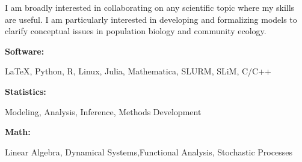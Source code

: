 \documentclass[9pt]{developercv} %
\begin{document}
\begin{minipage}[t]{0.46\textwidth}
	\vspace{-6pt}

	I am broadly interested in collaborating on any scientific topic where my skills are useful. I am particularly interested in developing and formalizing models to clarify conceptual issues in population biology and community ecology. \\

\end{minipage}
\hfill %
\begin{minipage}[t]{0.465\textwidth}
    \vspace{-6pt}
    
    \begin{minipage}[t]{0.2\textwidth}
        \textbf{Software:}
    \end{minipage}
    \hfill
    \begin{minipage}[t]{0.75\textwidth}
      \LaTeX, Python, R, Linux, Julia, Mathematica, SLURM, SLiM, C/C++
    \end{minipage}
    \vspace{4mm}

    \vspace{-5 pt}
    \begin{minipage}[t]{0.2\textwidth}
        \textbf{Statistics:}
    \end{minipage}
    \hfill
    \begin{minipage}[t]{0.75\textwidth}
      Modeling, Analysis, Inference, Methods Development
    \end{minipage}
    \vspace{4mm}

    \vspace{-5 pt}
    \begin{minipage}[t]{0.2\textwidth}
        \textbf{Math:}
    \end{minipage}
    \hfill
    \begin{minipage}[t]{0.75\textwidth}
      Linear Algebra, Dynamical Systems,\newline Functional Analysis, Stochastic Processes
    \end{minipage}

\end{minipage}

\end{document}
